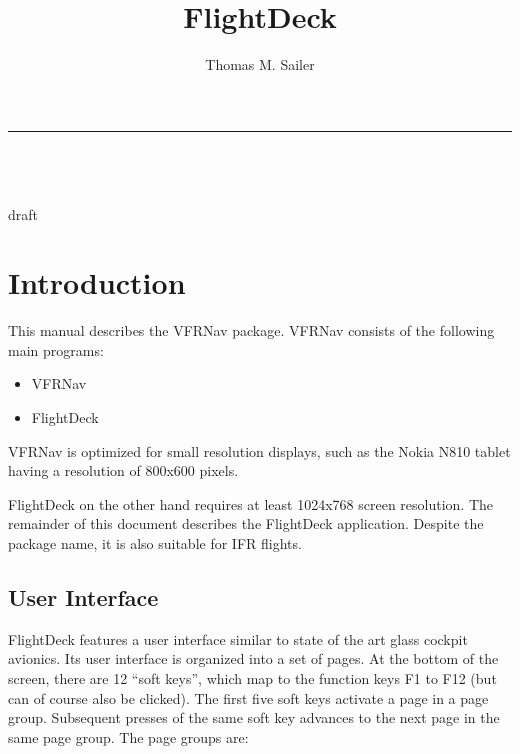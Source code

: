 \documentclass[a4paper,10pt,pdftex]{article}
\begin{document}
\sloppy

\title{FlightDeck}
\author{Thomas M. Sailer}

%
\makeatletter
\newpage\thispagestyle{empty}
\noindent\begin{minipage}{\textwidth}
  \flushright
  {\sffamily\bfseries\Huge\@title}
  \noindent\rule[-1ex]{\textwidth}{5pt}\\[5ex]
  {\sffamily\Large\@author}\\[1.5ex]
  {\sffamily\Large\@date}\\[5ex]
  {\sffamily\Large draft}\\[5ex]
\end{minipage}
\makeatother
%
\tableofcontents

\newcommand\graycol{\iftexht\else\cellcolor[gray]{.9}\fi}


\section{Introduction}

This manual describes the VFRNav package. VFRNav consists of the
following main programs:

\begin{itemize}
\item VFRNav
\item FlightDeck
\end{itemize}

VFRNav is optimized for small resolution displays, such as the Nokia
N810 tablet having a resolution of 800x600 pixels.

FlightDeck on the other hand requires at least 1024x768 screen
resolution. The remainder of this document describes the FlightDeck
application. Despite the package name, it is also suitable for IFR
flights.

\subsection{User Interface}

FlightDeck features a user interface similar to state of the art glass
cockpit avionics. Its user interface is organized into a set of
pages. At the bottom of the screen, there are 12 ``soft keys'', which
map to the function keys F1 to F12 (but can of course also be
clicked). The first five soft keys activate a page in a page
group. Subsequent presses of the same soft key advances to the next
page in the same page group. The page groups are:
\end{document}
